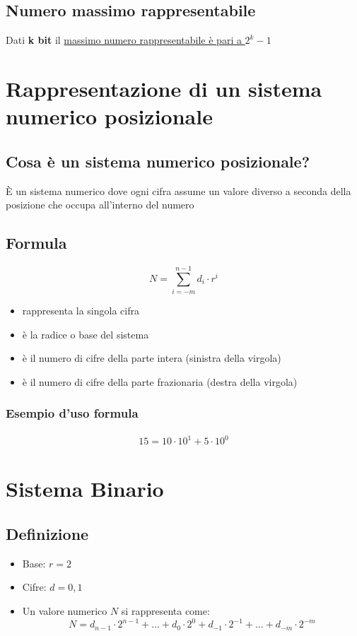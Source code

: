 \subsection{Numero massimo rappresentabile}
Dati \textbf{k bit} il \uline{massimo numero rappresentabile è pari a $2^k - 1$}

\newpage
\section{Rappresentazione di un sistema numerico posizionale}
\subsection{Cosa è un sistema numerico posizionale?}
È un sistema numerico dove ogni cifra assume un valore diverso a seconda della posizione che occupa all'interno del numero

\subsection{Formula}
\begin{tcolorbox}
    {
        \LARGE
        $$
            N = \sum^{n-1}_{i=-m} d_i \cdot r^i
        $$
    }
    \begin{itemize}
        \item[$d$ -] rappresenta la singola cifra
        \item [$r$ -] è la radice o base del sistema
        \item [$n$ -] è il numero di cifre della parte intera (sinistra della virgola)
        \item [$m$ -] è il numero di cifre della parte frazionaria (destra della virgola)
    \end{itemize}
    
    \subsubsection{Esempio d'uso formula}
    {
        \Large
        \begin{gather*}
            15 = 10 \cdot 10^1 + 5 \cdot 10^0
        \end{gather*}
    }
\end{tcolorbox}

\section{Sistema Binario}
\subsection{Definizione}
\begin{itemize}
    \item Base: $r=2$
    \item Cifre: $d=0,1$
    \item Un valore numerico $N$ si rappresenta come:
    {\large
        $$
            N = d_{n-1} \cdot 2^{n-1} + \dots + d_0 \cdot 2^0 + d_{-1} \cdot 2^{-1} + \dots + d_{-m} \cdot 2^{-m}
        $$
    }
\end{itemize}

